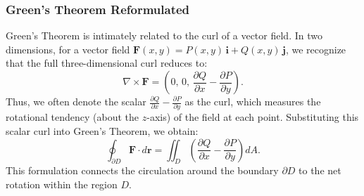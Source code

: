 \subsubsection*{Green's Theorem Reformulated}
\noindent Green's Theorem is intimately related to the curl of a vector field. In two dimensions, for a vector field 
\(\mathbf{F}(x,y) = P(x,y)\,\mathbf{i} + Q(x,y)\,\mathbf{j}\),
we recognize that the full three-dimensional curl reduces to:
\[
\nabla \times \mathbf{F} = \left(0,\,0,\,\frac{\partial Q}{\partial x} - \frac{\partial P}{\partial y}\right).
\]
Thus, we often denote the scalar 
\(\frac{\partial Q}{\partial x} - \frac{\partial P}{\partial y}\) 
as the curl, which measures the rotational tendency (about the \(z\)-axis) of the field at each point. Substituting this scalar curl into Green's Theorem, we obtain:
\[
\oint_{\partial D} \mathbf{F} \cdot d\mathbf{r} = \iint_D \left(\frac{\partial Q}{\partial x} - \frac{\partial P}{\partial y}\right) dA.
\]
This formulation connects the circulation around the boundary \(\partial D\) to the net rotation within the region \(D\).

